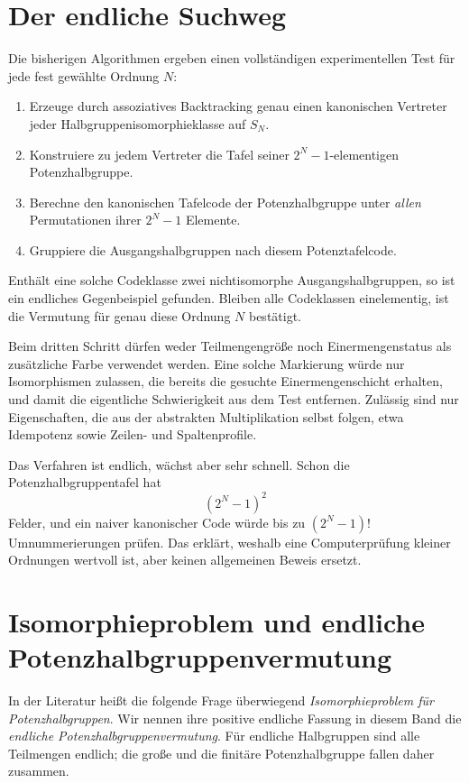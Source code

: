 \documentclass[main.tex]{subfiles}
\begin{document}
\section{Der endliche Suchweg}

Die bisherigen Algorithmen ergeben einen vollständigen experimentellen Test
für jede fest gewählte Ordnung \(N\):
\begin{enumerate}
  \item Erzeuge durch assoziatives Backtracking genau einen kanonischen
    Vertreter jeder Halbgruppenisomorphieklasse auf \(S_N\).
  \item Konstruiere zu jedem Vertreter die Tafel seiner
    \(2^N-1\)-elementigen Potenzhalbgruppe.
  \item Berechne den kanonischen Tafelcode der Potenzhalbgruppe unter
    \emph{allen} Permutationen ihrer \(2^N-1\) Elemente.
  \item Gruppiere die Ausgangshalbgruppen nach diesem Potenztafelcode.
\end{enumerate}
Enthält eine solche Codeklasse zwei nichtisomorphe Ausgangshalbgruppen, so ist
ein endliches Gegenbeispiel gefunden.  Bleiben alle Codeklassen einelementig,
ist die Vermutung für genau diese Ordnung \(N\) bestätigt.

\begin{remark}
Beim dritten Schritt dürfen weder Teilmengengröße noch Einermengenstatus als
zusätzliche Farbe verwendet werden.  Eine solche Markierung würde nur
Isomorphismen zulassen, die bereits die gesuchte Einermengenschicht erhalten,
und damit die eigentliche Schwierigkeit aus dem Test entfernen.  Zulässig
sind nur Eigenschaften, die aus der abstrakten Multiplikation selbst folgen,
etwa Idempotenz sowie Zeilen- und Spaltenprofile.
\end{remark}

Das Verfahren ist endlich, wächst aber sehr schnell.  Schon die
Potenzhalbgruppentafel hat
\[
  (2^N-1)^2
\]
Felder, und ein naiver kanonischer Code würde bis zu
\((2^N-1)!\) Umnummerierungen prüfen.  Das erklärt, weshalb eine
Computerprüfung kleiner Ordnungen wertvoll ist, aber keinen allgemeinen
Beweis ersetzt.

\section{Isomorphieproblem und endliche Potenzhalbgruppenvermutung}

In der Literatur heißt die folgende Frage überwiegend
\emph{Isomorphieproblem für Potenzhalbgruppen}.  Wir nennen ihre positive
endliche Fassung in diesem Band die \emph{endliche
Potenzhalbgruppenvermutung}.  Für endliche Halbgruppen sind alle Teilmengen
endlich; die große und die finitäre Potenzhalbgruppe fallen daher zusammen.
\end{document}
